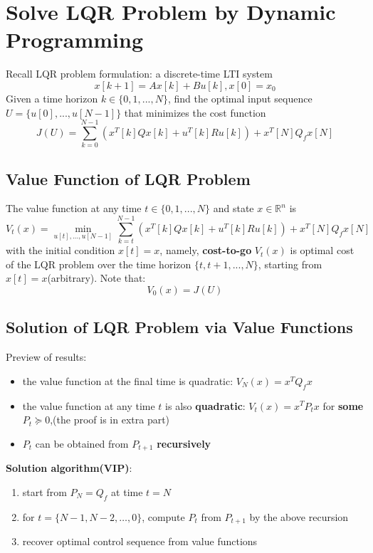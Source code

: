 \documentclass[10pt,a4paper,oneside]{article}
\begin{document}
\section{Solve LQR Problem by Dynamic Programming}
Recall LQR problem formulation: a discrete-time LTI system
\[
x[k+1]=Ax[k]+Bu[k],x[0]=x_0
\]
Given a time horizon $k\in\{0,1,...,N\}$, find the optimal input sequence $U=\{u[0],...,u[N-1]\}$ that minimizes the cost function
\[
J(U)=\sum_{k=0}^{N-1}(x^T[k] Q x[k]+u^T[k] R u[k])+x^T[N] Q_f x[N]
\]

\subsection{Value Function of LQR Problem}
The value function at any time $t\in\{0,1,...,N\}$ and state $x\in\mathbb{R}^n$ is
\[
V_t(x)=\min_{u[t],...,u[N-1]}\sum_{k=t}^{N-1}(x^T[k] Q x[k]+u^T[k] R u[k])+x^T[N] Q_f x[N]
\]
with the initial condition $x[t]=x$, namely, \textbf{cost-to-go} $V_t(x)$ is optimal cost of the LQR problem over the time horizon $\{t,t+1,...,N\}$, starting from $x[t]=x$(arbitrary). Note that:
\[
V_0(x) = J(U)
\]

\subsection{Solution of LQR Problem via Value Functions}
Preview of results:
\begin{itemize}
	\item the value function at the final time is quadratic: $V_N(x)=x^T Q_f x$
	\item the value function at any time $t$ is also \textbf{quadratic}: $V_t(x)=x^T P_t x$ for \textbf{some} $P_t \succeq 0$,(the proof is in extra part)
	\item $P_t$ can be obtained from $P_{t+1}$ \textbf{recursively}
\end{itemize}
\textbf{Solution algorithm(VIP)}:
\begin{enumerate}
	\item start from $P_N = Q_f$ at time $t=N$
	\item for $t = \{N-1, N-2, \dots, 0\}$, compute $P_t$ from $P_{t+1}$ by the above recursion
	\item recover optimal control sequence from value functions
\end{enumerate}
\end{document}
